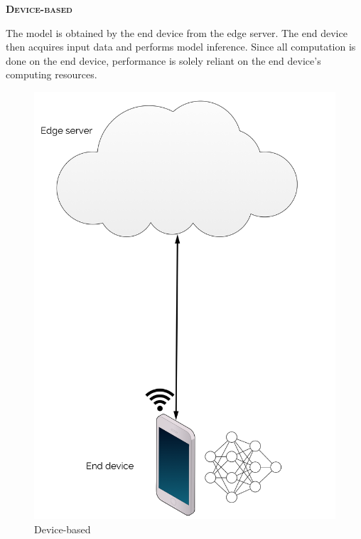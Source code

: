 \begin{minipage}{0.65\linewidth}
	\textbf{\textsc{Device-based}}
	
	The model is obtained by the end device from the edge server. The end device then acquires input data and performs model inference. Since all computation is done on the end device, performance is solely reliant on the end device's computing resources. 
\end{minipage}%
\hfill
\begin{minipage}{0.3\linewidth}
	\centering
	\begin{figure}
		\centering
		\includegraphics[width=\linewidth]{figures/models/device}
		\caption[Device-based]{Device-based}
	\end{figure}
\end{minipage}

